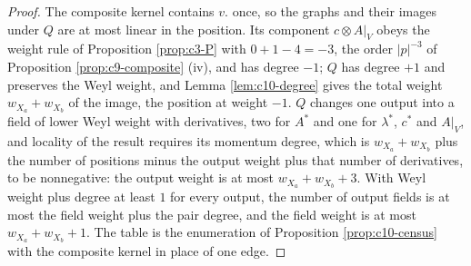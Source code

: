 \begin{proof}
The composite kernel contains $v.$ once, so the graphs and their images under $Q$ are at most linear in the position. Its component $c\otimes A|_V$ obeys the weight rule of Proposition \ref{prop:c3-P} with $0+1-4=-3$, the order $|p|^{-3}$ of Proposition \ref{prop:c9-composite} (iv), and has degree $-1$; $Q$ has degree $+1$ and preserves the Weyl weight, and Lemma \ref{lem:c10-degree} gives the total weight $w_{X_a}+w_{X_b}$ of the image, the position at weight $-1$. $Q$ changes one output into a field of lower Weyl weight with derivatives, two for $A^*$ and one for $\lambda^*$, $c^*$ and $A|_V$, and locality of the result requires its momentum degree, which is $w_{X_a}+w_{X_b}$ plus the number of positions minus the output weight plus that number of derivatives, to be nonnegative: the output weight is at most $w_{X_a}+w_{X_b}+3$. With Weyl weight plus degree at least $1$ for every output, the number of output fields is at most the field weight plus the pair degree, and the field weight is at most $w_{X_a}+w_{X_b}+1$. The table is the enumeration of Proposition \ref{prop:c10-census} with the composite kernel in place of one edge.
\end{proof}

